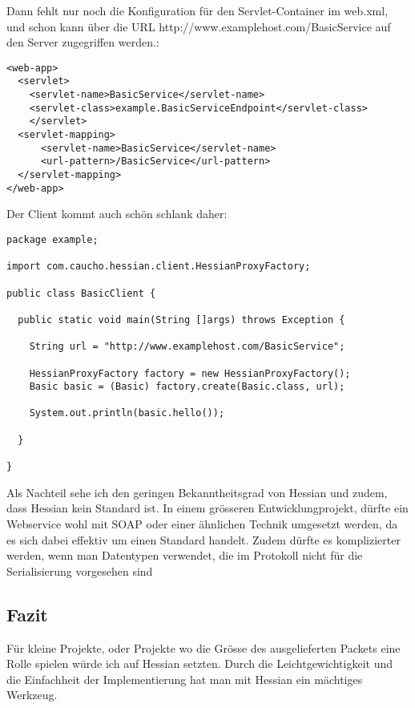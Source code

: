 \documentclass[abstracton, listof=totocnumbered,
bibliography=totocnumbered]{scrreprt}
\begin{document}
  Dann fehlt nur noch die Konfiguration für den Servlet-Container im web.xml,
  und schon kann über die \ac{URL} http://www.examplehost.com/BasicService auf
  den Server zugegriffen werden.:
  
\begin{verbatim}
<web-app>  
  <servlet>
    <servlet-name>BasicService</servlet-name>
    <servlet-class>example.BasicServiceEndpoint</servlet-class>
    </servlet>
  <servlet-mapping>
      <servlet-name>BasicService</servlet-name>
      <url-pattern>/BasicService</url-pattern>
  </servlet-mapping>
</web-app>
\end{verbatim}

  Der Client kommt auch schön schlank daher:

\begin{verbatim}  
package example;

import com.caucho.hessian.client.HessianProxyFactory;

public class BasicClient {

  public static void main(String []args) throws Exception {
  
    String url = "http://www.examplehost.com/BasicService";

    HessianProxyFactory factory = new HessianProxyFactory();
    Basic basic = (Basic) factory.create(Basic.class, url);

    System.out.println(basic.hello());
    
  }
  
}
\end{verbatim}  
  
  Als Nachteil sehe ich den geringen Bekanntheitsgrad von Hessian und zudem,
  dass Hessian kein Standard ist. In einem grösseren Entwicklungprojekt, dürfte
  ein Webservice wohl mit \ac{SOAP} oder einer ähnlichen Technik umgesetzt
  werden, da es sich dabei effektiv um einen Standard handelt. Zudem dürfte es
  komplizierter werden, wenn man Datentypen verwendet, die im Protokoll nicht
  für die Serialisierung vorgesehen sind
  
  \subsection{Fazit}
  
  Für kleine Projekte, oder Projekte wo die Grösse des ausgelieferten Packets
  eine Rolle spielen würde ich auf Hessian setzten. Durch die
  Leichtgewichtigkeit und die Einfachheit der Implementierung hat man mit
  Hessian ein mächtiges Werkzeug.
  
\end{document}
